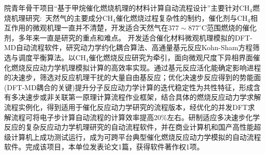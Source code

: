 院青年骨干项目``基于甲烷催化燃烧机理的材料计算自动流程设计''主要针对$\mathrm{CH}_4$燃烧机理研究:~天然气的主要成分$\mathrm{CH}_4$催化燃烧过程复杂性的制约，催化剂与$\mathrm{CH}_4$相互作用的微观机理一直并不清楚，开发适合天然气在$377\sim877^{\circ}\mathrm{C}$范围燃烧的催化剂，多年来一直是研究的重点和难点。%
开发适合催化材料微观机理模拟的\textrm{DFT-MD}自动流程软件，研究动力学约化耦合算法、高通量基元反应\textrm{Kohn-Sham}方程筛选与调度平衡算法。以$\mathrm{CH}_4$催化燃烧反应研究为牵引，面向微观尺度下异相界面催化燃烧反应动力学机理模拟计算的高效率实现。通过基元反应活化能确定影响进程的决速步，筛选对反应机理干扰的大量自由基反应；优化决速步反应得到的势能面(\textrm{DFT-MD}耦合的关键)提升分子反应动力学计算的迭代稳定性为共性特征，形成含有多决速步或非关联第一原理计算流程作业框架，结合具体的燃烧反应动力学求解流程实例化，得到适用于催化反应动力学研究的流程版本，经优化的并发\textrm{DFT}求解流程可将电子步计算自动流程的计算效率提高20\%左右。研制适应多决速步化学反应的复杂反应动力学机理研究的自动流程软件，并在商业计算机和国产高性能超级计算机上成功测试运行，成为可跨平台典型催化燃烧反应动力学模拟的自动流程软件。完成该项目，本单位发表论文1篇，获得软件著作权1项。

